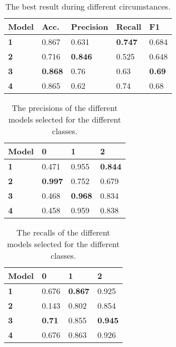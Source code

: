 \documentclass[twocolumn]{article}
\begin{document}
\begin{table}[]

\begin{tabular}{|l|l|l|l|l|}
\hline
\textbf{Model}                                    & \textbf{Acc.} & \textbf{Precision} & \textbf{Recall} & \textbf{F1} \\ \hline
\textbf{1} 		    & 0.867             & 0.631              & \textbf{0.747}           & 0.684             \\ \hline
\textbf{2}               & 0.716             & \textbf{0.846}              & 0.525           & 0.648             \\ \hline
\textbf{3}               & \textbf{0.868}             & 0.76                & 0.63             & \textbf{0.69}              \\ \hline
\textbf{4}           	    & 0.865             & 0.62                & 0.74             & 0.68              \\ \hline
\end{tabular}
\caption{The best result during different circumstances. }
\label{tab:top_results}
\end{table}

\begin{table}[]

\begin{tabular}{|l|l|l|l|}
\hline
\textbf{Model} & \textbf{0} & \textbf{1} & \textbf{2} \\ \hline
\textbf{1}     & 0.471      & 0.955      & \textbf{0.844}      \\ \hline
\textbf{2}     & \textbf{0.997}      & 0.752      & 0.679      \\ \hline
\textbf{3}     & 0.468      & \textbf{0.968}      & 0.834      \\ \hline
\textbf{4}     & 0.458      & 0.959      & 0.838      \\ \hline
\end{tabular}
\caption{The precisions of the different models selected for the different classes.}
\label{tab:precisionss}
\end{table}

\begin{table}[]

\begin{tabular}{|l|l|l|l|}
\hline
\textbf{Model} & \textbf{0} & \textbf{1} & \textbf{2} \\ \hline
\textbf{1}     & 0.676      & \textbf{0.867}      & 0.925      \\ \hline
\textbf{2}     & 0.143      & 0.802      & 0.854      \\ \hline
\textbf{3}     & \textbf{0.71}       & 0.855      & \textbf{0.945}      \\ \hline
\textbf{4}     & 0.676      & 0.863      & 0.926      \\ \hline
\end{tabular}
\caption{The recalls of the different models selected for the different classes.}
\label{tab:recalls}
\end{table}
\end{document}
